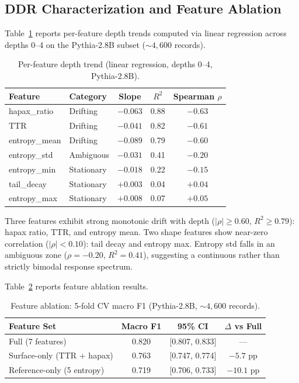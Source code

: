 \documentclass[11pt,a4paper]{article}
\begin{document}
\subsection{DDR Characterization and Feature Ablation}

Table~\ref{tab:feature_trend} reports per-feature depth trends computed via linear regression across depths 0--4 on the Pythia-2.8B subset (${\sim}4{,}600$ records).

\begin{table}[t]
\centering
\small
\caption{Per-feature depth trend (linear regression, depths 0--4, Pythia-2.8B).}
\label{tab:feature_trend}
\begin{tabular}{llccc}
\toprule
Feature & Category & Slope & $R^2$ & Spearman $\rho$ \\
\midrule
hapax\_ratio & Drifting & $-0.063$ & 0.88 & $-0.63$ \\
TTR & Drifting & $-0.041$ & 0.82 & $-0.61$ \\
entropy\_mean & Drifting & $-0.089$ & 0.79 & $-0.60$ \\
entropy\_std & Ambiguous & $-0.031$ & 0.41 & $-0.20$ \\
entropy\_min & Stationary & $-0.018$ & 0.22 & $-0.15$ \\
tail\_decay & Stationary & $+0.003$ & 0.04 & $+0.04$ \\
entropy\_max & Stationary & $+0.008$ & 0.07 & $+0.05$ \\
\bottomrule
\end{tabular}
\end{table}

Three features exhibit strong monotonic drift with depth ($|\rho| \geq 0.60$, $R^2 \geq 0.79$): hapax ratio, TTR, and entropy mean. Two shape features show near-zero correlation ($|\rho| < 0.10$): tail decay and entropy max. Entropy std falls in an ambiguous zone ($\rho = -0.20$, $R^2 = 0.41$), suggesting a continuous rather than strictly bimodal response spectrum.

Table~\ref{tab:ablation} reports feature ablation results.

\begin{table}[t]
\centering
\small
\caption{Feature ablation: 5-fold CV macro F1 (Pythia-2.8B, ${\sim}4{,}600$ records).}
\label{tab:ablation}
\begin{tabular}{lccc}
\toprule
Feature Set & Macro F1 & 95\% CI & $\Delta$ vs Full \\
\midrule
Full (7 features) & 0.820 & [0.807, 0.833] & --- \\
Surface-only (TTR + hapax) & 0.763 & [0.747, 0.774] & $-5.7$ pp \\
Reference-only (5 entropy) & 0.719 & [0.706, 0.733] & $-10.1$ pp \\
\bottomrule
\end{tabular}
\end{table}
\end{document}
